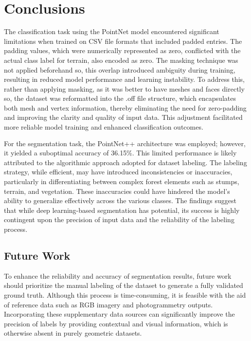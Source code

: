 \documentclass[../report.tex]{subfiles}
\begin{document}
    \section{Conclusions}
    \label{sec:conclusions}
    The classification task using the PointNet model encountered significant limitations when trained on CSV file formats that included padded entries. The padding values, which were numerically represented as zero, conflicted with the actual class label for terrain, also encoded as zero. The masking technique was not applied  beforehand so, this overlap introduced ambiguity during training, resulting in reduced model performance and learning instability. To address this, rather than applying masking, as it was better to have meshes and faces directly so, the dataset was reformatted into the .off file structure, which encapsulates both mesh and vertex information, thereby eliminating the need for zero-padding and improving the clarity and quality of input data. This adjustment facilitated more reliable model training and enhanced classification outcomes.

    For the segmentation task, the PointNet++ architecture was employed; however, it yielded a suboptimal accuracy of 36.15\%. This limited performance is likely attributed to the algorithmic approach adopted for dataset labeling. The labeling strategy, while efficient, may have introduced inconsistencies or inaccuracies, particularly in differentiating between complex forest elements such as stumps, terrain, and vegetation. These inaccuracies could have hindered the model’s ability to generalize effectively across the various classes. The findings suggest that while deep learning-based segmentation has potential, its success is highly contingent upon the precision of input data and the reliability of the labeling process.



    \subsection{Future Work}
    \label{sec:conclusions:future_work}
    To enhance the reliability and accuracy of segmentation results, future work should prioritize the manual labeling of the dataset to generate a fully validated ground truth. Although this process is time-consuming, it is feasible with the aid of reference data such as RGB imagery and photogrammetry outputs. Incorporating these supplementary data sources can significantly improve the precision of labels by providing contextual and visual information, which is otherwise absent in purely geometric datasets.
\end{document}
